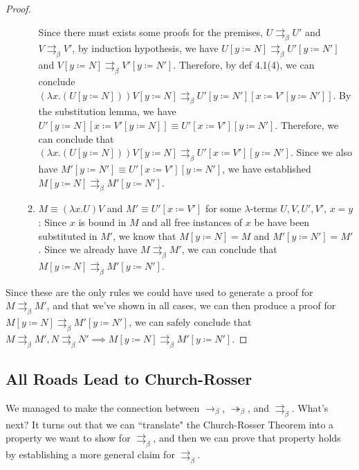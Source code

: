 \documentclass[a4paper,11pt]{article}
\theoremstyle{definition}
\theoremstyle{example}
\theoremstyle{lemma}
\newcommand{\lamterm}[2]{\lambda #1. #2}
\newcommand{\subs}[3]{#1[#2\coloneqq#3]}
\newcommand{\ssbr}{\rightarrow_{\beta}}
\newcommand{\msbr}{\twoheadrightarrow_{\beta}}
\newcommand{\pbr}{\rightrightarrows_{\beta}}
\begin{document}
\begin{proof}
\begin{enumerate}[topsep=2pt,itemsep=-0.5ex,partopsep=1ex,parsep=1ex]
\begin{enumerate}[topsep=-4pt,itemsep=-0.5ex,partopsep=1ex,parsep=1ex]
       Since there must exists some proofs for the premises, $U \pbr U'$ and $V \pbr V'$, by induction hypothesis, we have $\subs{U}{y}{N} \pbr \subs{U'}{y}{N'}$ and $\subs{V}{y}{N} \pbr \subs{V'}{y}{N'}$. Therefore, by def 4.1(4), we can conclude $(\lamterm{x}{(\subs{U}{y}{N})})\subs{V}{y}{N} \pbr \subs{\subs{U'}{y}{N'}}{x}{\subs{V'}{y}{N'}}$. By the substitution lemma, we have $\subs{\subs{U'}{y}{N}}{x}{\subs{V'}{y}{N}} \equiv \subs{\subs{U'}{x}{V'}}{y}{N'}$. Therefore, we can conclude that $(\lamterm{x}{(\subs{U}{y}{N})})\subs{V}{y}{N} \pbr \subs{\subs{U'}{x}{V'}}{y}{N'}$. Since we also have $\subs{M'}{y}{N'} \equiv \subs{\subs{U'}{x}{V'}}{y}{N'}$, we have established $\subs{M}{y}{N} \pbr \subs{M'}{y}{N'}$.
       
       \item $M \equiv (\lamterm{x}{U})V$ and $M' \equiv \subs{U'}{x}{V'}$ for some $\lambda$-terms $U, V, U', V'$, $x = y$: Since $x$ is bound in $M$ and all free instances of $x$ be have been substituted in $M'$, we know that $\subs{M}{y}{N} = M$ and $\subs{M'}{y}{N'} = M'$. Since we already have $M \pbr M'$, we can conclude that $\subs{M}{y}{N} \pbr \subs{M'}{y}{N'}$.
           
     \end{enumerate}
     
\end{enumerate}
Since these are the only rules we could have used to generate a proof for $M \pbr M'$, and that we've shown in all cases, we can then produce a proof for $\subs{M}{y}{N} \pbr \subs{M'}{y}{N'}$, we can safely conclude that $M \pbr M', N \pbr N' \implies \subs{M}{y}{N} \pbr \subs{M'}{y}{N'}$.
\end{proof}

\subsection{All Roads Lead to Church-Rosser}

We managed to make the connection between $\ssbr$, $\msbr$, and $\pbr$. What's next? It turns out that we can ``translate" the Church-Rosser Theorem into a property we want to show for $\pbr$, and then we can prove that property holds by establishing a more general claim for $\pbr$. 
\end{document}

